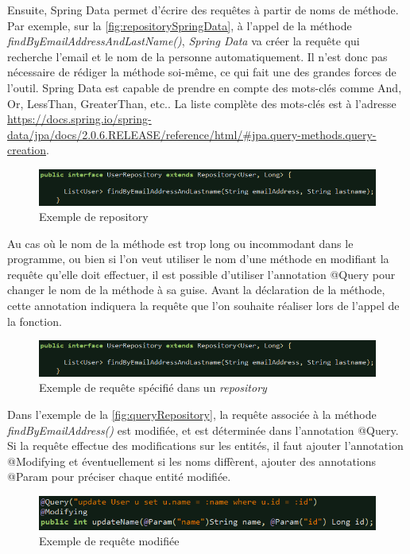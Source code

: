 \documentclass{polytech/polytech}
\begin{document}
Ensuite, Spring Data permet d’écrire des requêtes à partir de noms de méthode. Par exemple, sur la \autoref{fig:repositorySpringData}, à l’appel de la méthode \textit{findByEmailAddressAndLastName()}, \textit{Spring Data} va créer la requête qui recherche l’email et le nom de la personne automatiquement. Il n’est donc pas nécessaire de rédiger la méthode soi-même, ce qui fait une des grandes forces de l’outil. Spring Data est capable de prendre en compte des mots-clés comme And, Or, LessThan, GreaterThan, etc.. La liste complète des mots-clés est à l’adresse \url{https://docs.spring.io/spring-data/jpa/docs/2.0.6.RELEASE/reference/html/#jpa.query-methods.query-creation}.

\begin{figure}
	\includegraphics[scale=0.8]{images/repositorySpringData}
	\caption{Exemple de repository}
	\label{fig:repositorySpringData}
\end{figure}

Au cas où le nom de la méthode est trop long ou incommodant dans le programme, ou bien si l’on veut utiliser le nom d’une méthode en modifiant la requête qu’elle doit effectuer, il est possible d’utiliser l’annotation @Query pour changer le nom de la méthode à sa guise. Avant la déclaration de la méthode, cette annotation indiquera la requête que l’on souhaite réaliser lors de l’appel de la fonction.

\begin{figure}
	\includegraphics[scale=0.8]{images/repositorySpringData}
	\caption{Exemple de requête spécifié dans un \textit{repository}}
	\label{fig:queryRepository}
\end{figure}

Dans l’exemple de la \autoref{fig:queryRepository}, la requête associée à la méthode \textit{findByEmailAddress()} est modifiée, et est déterminée dans l’annotation @Query. Si la requête effectue des modifications sur les entités, il faut ajouter l’annotation @Modifying et éventuellement si les noms diffèrent, ajouter des annotations @Param pour préciser chaque entité modifiée. 

\begin{figure}
	\includegraphics[scale=0.85]{images/queryModifying}
	\caption{Exemple de requête modifiée}
	\label{fig:queryModifying}
\end{figure}
\end{document}
